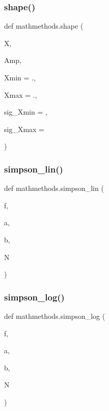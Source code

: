 \mbox{\label{namespacemathmethods_af17be6ba19612297cd409ccd16f251d1}} 
\subsubsection{\texorpdfstring{shape()}{shape()}}
{\footnotesize\ttfamily def mathmethods.\+shape (\begin{DoxyParamCaption}\item[{}]{X,  }\item[{}]{Amp,  }\item[{}]{Xmin = {.},  }\item[{}]{Xmax = {.},  }\item[{}]{sig\+\_\+\+Xmin = {},  }\item[{}]{sig\+\_\+\+Xmax = {} }\end{DoxyParamCaption})}

\mbox{\label{namespacemathmethods_a04d1b19b7bbc80ee46a405193fb54043}} 
\subsubsection{\texorpdfstring{simpson\+\_\+lin()}{simpson\_lin()}}
{\footnotesize\ttfamily def mathmethods.\+simpson\+\_\+lin (\begin{DoxyParamCaption}\item[{}]{f,  }\item[{}]{a,  }\item[{}]{b,  }\item[{}]{N }\end{DoxyParamCaption})}

\mbox{\label{namespacemathmethods_a1083810dcaa88792a88cb2fa019cc808}} 
\subsubsection{\texorpdfstring{simpson\+\_\+log()}{simpson\_log()}}
{\footnotesize\ttfamily def mathmethods.\+simpson\+\_\+log (\begin{DoxyParamCaption}\item[{}]{f,  }\item[{}]{a,  }\item[{}]{b,  }\item[{}]{N }\end{DoxyParamCaption})}


